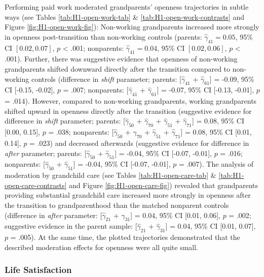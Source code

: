 \documentclass[
  english,
  man, noextraspace]{apa7}
\begin{document}
Performing paid work moderated grandparents' openness trajectories in subtle ways (see Tables \ref{tab:H1-open-work-tab} \& \ref{tab:H1-open-work-contrasts} and Figure \ref{fig:H1-open-work-fig}): Non-working grandparents increased more strongly in openness post-transition than non-working controls (parents: \(\hat{\gamma}_{41} = 0.05\), 95\% CI \([0.02, 0.07]\), \(p\) \textless{} .001; nonparents: \(\hat{\gamma}_{41} = 0.04\), 95\% CI \([0.02, 0.06]\), \(p\) \textless{} .001). Further, there was suggestive evidence that openness of non-working grandparents shifted downward directly after the transition compared to non-working controls (difference in \emph{shift} parameter; parents: {[}\(\hat{\gamma}_{41}\) + \(\hat{\gamma}_{61}\){]} = -0.09, 95\% CI {[}-0.15, -0.02{]}, \(p\) = .007; nonparents: {[}\(\hat{\gamma}_{41}\) + \(\hat{\gamma}_{61}\){]} = -0.07, 95\% CI {[}-0.13, -0.01{]}, \(p\) = .014). However, compared to non-working grandparents, working grandparents shifted upward in openness directly after the transition (suggestive evidence for difference in \emph{shift} parameter; parents: {[}\(\hat{\gamma}_{50}\) + \(\hat{\gamma}_{70}\) + \(\hat{\gamma}_{51}\) + \(\hat{\gamma}_{71}\){]} = 0.08, 95\% CI {[}0.00, 0.15{]}, \(p\) = .038; nonparents: {[}\(\hat{\gamma}_{50}\) + \(\hat{\gamma}_{70}\) + \(\hat{\gamma}_{51}\) + \(\hat{\gamma}_{71}\){]} = 0.08, 95\% CI {[}0.01, 0.14{]}, \(p\) = .023) and decreased afterwards (suggestive evidence for difference in \emph{after} parameter; parents: {[}\(\hat{\gamma}_{50}\) + \(\hat{\gamma}_{51}\){]} = -0.04, 95\% CI {[}-0.07, -0.01{]}, \(p\) = .016; nonparents: {[}\(\hat{\gamma}_{50}\) + \(\hat{\gamma}_{51}\){]} = -0.04, 95\% CI {[}-0.07, -0.01{]}, \(p\) = .007). The analysis of moderation by grandchild care (see Tables \ref{tab:H1-open-care-tab} \& \ref{tab:H1-open-care-contrasts} and Figure \ref{fig:H1-open-care-fig}) revealed that grandparents providing substantial grandchild care increased more strongly in openness after the transition to grandparenthood than the matched nonparent controls (difference in \emph{after} parameter: {[}\(\hat{\gamma}_{21}\) + \(\hat{\gamma}_{31}\){]} = 0.04, 95\% CI {[}0.01, 0.06{]}, \(p\) = .002; suggestive evidence in the parent sample: {[}\(\hat{\gamma}_{21}\) + \(\hat{\gamma}_{31}\){]} = 0.04, 95\% CI {[}0.01, 0.07{]}, \(p\) = .005). At the same time, the plotted trajectories demonstrated that the described moderation effects for openness were all quite small.

\hypertarget{life-satisfaction-1}{%
\subsubsection{Life Satisfaction}\label{life-satisfaction-1}}
\end{document}
